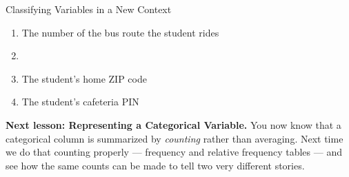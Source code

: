 \documentclass[12pt]{article}
\newcommand{\answerspace}[2]{\par\nopagebreak\noindent\begin{minipage}[t][#1][t]{\linewidth}%
  \color{keyred}\bfseries #2\end{minipage}\par}
\begin{document}
\begin{notesbox}{Classifying Variables in a New Context}
\begin{enumerate}[leftmargin=1.9em, itemsep=7pt]
\begin{enumerate}[label=\textbf{(\Alph*)}, leftmargin=2.2em, itemsep=3pt]
          \item The number of the bus route the student rides
          \item {}
          \item The student's home ZIP code
          \item The student's cafeteria PIN
                \hfill{}
        \end{enumerate}
        \answerspace{2.15in}{\normalcolor\mdseries\gradedblank[id=hw5j, type=rubric, points=1,
          display={(C). Minutes are a measured amount, so 90 minutes really is twice
        45. The other four are labels written in digits.}]{\linewidth}{2.5cm}}
\end{enumerate}
\end{notesbox}

\vspace{0.12in}

\boxguard[10]
\begin{spiralbox}
\small
\textbf{Next lesson: Representing a Categorical Variable.} You now know that a categorical
column is summarized by \emph{counting} rather than averaging. Next time we do that counting
properly --- frequency and relative frequency tables --- and see how the same counts can be
made to tell two very different stories.
\end{spiralbox}
\end{document}
